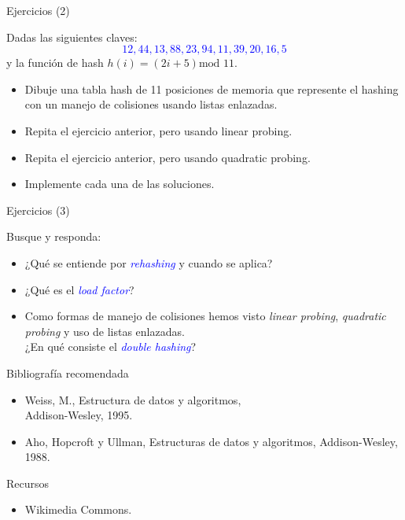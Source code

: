 \documentclass[handout]{beamer} %
\newcommand{\blue}[1]{\textcolor{blue}{#1}}
\begin{document}
\begin{frame}{Ejercicios (2)}

    Dadas las siguientes claves:
    \blue{$$12, 44, 13, 88, 23, 94, 11, 39, 20, 16, 5$$}
    y la función de hash $h(i)=(2i+5)\mbox{mod }11$.

    \begin{itemize}
        \item Dibuje una tabla hash de 11 posiciones de memoria que represente el hashing con un manejo de colisiones usando listas enlazadas.
        \item Repita el ejercicio anterior, pero usando linear probing.
        \item Repita el ejercicio anterior, pero usando quadratic probing.
        \item Implemente cada una de las soluciones.
    \end{itemize}
\end{frame}

\begin{frame}{Ejercicios (3)}

    Busque y responda:

    \begin{itemize}
        \item ¿Qué se entiende por \blue{\em rehashing} y cuando se aplica?
        \item ¿Qué es el \blue{\em load factor}?
        \item Como formas de manejo de colisiones hemos visto {\em linear probing}, {\em quadratic probing} y uso de listas enlazadas.\\
        ¿En qué consiste el \blue{\em double hashing}?
    \end{itemize}
\end{frame}


\begin{frame}
 \begin{block}{Bibliografía recomendada}
  \begin{itemize}
    \item Weiss, M., Estructura de datos y algoritmos,\\ Addison-Wesley, 1995.
    \item Aho, Hopcroft y Ullman, Estructuras de datos y algoritmos, Addison-Wesley, 1988.
  \end{itemize}
 \end{block}
 \begin{block}{Recursos}
  \begin{itemize}
    \item Wikimedia Commons.
  \end{itemize}
 \end{block}
\end{frame}
\end{document}
